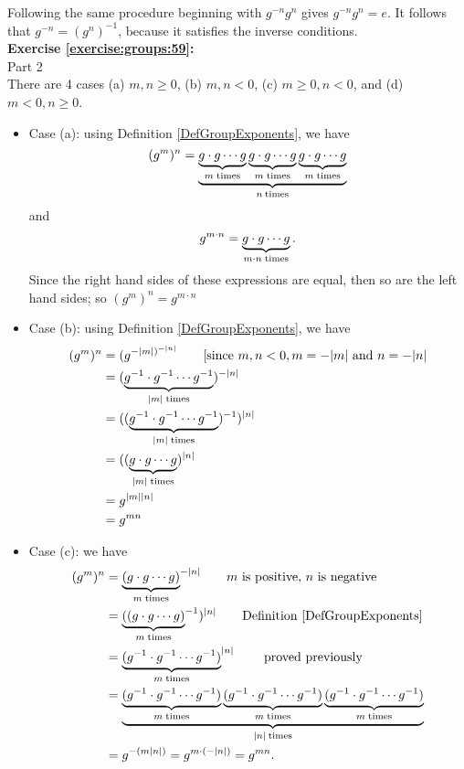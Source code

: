 \noindent Following the same procedure beginning with $g^{-n} g^n$ gives $g^{-n} g^n = e$.
It follows that $g^{-n} = (g^n)^{-1}$, because it satisfies the inverse conditions.
\\

\noindent\textbf{Exercise \ref{exercise:groups:59}:}
\\
Part 2\\
There are 4 cases (a) $m, n \geq 0$, (b) $m, n < 0$, (c) $m \geq 0, n < 0$, and (d) $m < 0, n \geq 0$.\\
\begin{itemize}
\item
Case (a): using Definition \ref{DefGroupExponents}, we have\\
\[
(g^m)^n = \underbrace{ \underbrace{g \cdot g \cdots g}_{m \; {\rm times}}\underbrace{g \cdot g \cdots g}_{m \; {\rm times}}\underbrace{g \cdot g \cdots g}_{m \; {\rm times}}}_{n \: {\rm times}}
\]
and
\[
g^{m \cdot n} = \underbrace{g \cdot g \cdots g}_{m \cdot n \; {\rm times}}.
\]
Since the right hand sides of these expressions are equal, then so are the left hand sides; so $(g^m)^n = g^{m \cdot n}$\\

\item
Case (b): using Definition  \ref{DefGroupExponents}, we have\\
\begin{align*}
(g^m)^n &= (g^{-{|m|})^{-|n|}}  \qquad \text{[since }m,n < 0, m=-|m| \text{ and } n=-|n|\\
&= ( \underbrace{g^{-1} \cdot g^{-1} \cdots g^{-1}}_{|m| \; {\rm times}})^{-|n|}\\
&= (( \underbrace{g^{-1} \cdot g^{-1} \cdots g^{-1}}_{|m| \; {\rm times}})^{-1})^{|n|}\\
&= (( \underbrace{g \cdot g \cdots g}_{|m| \; {\rm times}})^{|n|}\\
& = g^{|m||n|}\\
&=g^{mn}
\end{align*}

\item
Case (c): we have\\
\begin{align*}
(g^m)^n &= {\underbrace{(g \cdot g \cdots g)}_{m \; {\rm times}}}^{-|n|}  \quad \quad m \text{ is positive, } n \text{ is negative}\\
&= {\underbrace{((g \cdot g \cdots g)}_{m \; {\rm times}}}^{-1})^{|n|}  \quad \quad \text{Definition  \ref{DefGroupExponents}}\\
& = {\underbrace{(g^{-1} \cdot g^{-1}  \cdots g^{-1})}_{m \; {\rm times}}}^{|n|}  \quad \quad \text{ proved previously}\\
&= \underbrace{ \underbrace{(g^{-1} \cdot g^{-1} \cdots g^{-1})}_{m \; {\rm times}}\underbrace{(g^{-1} \cdot g^{-1} \cdots g^{-1})}_{m \; {\rm times}}\underbrace{(g^{-1} \cdot g^{-1} \cdots g^{-1})}_{m \; {\rm times}}}_{|n| \: {\rm times}}\\
 &= g^{-(m  |n|)} = g^{m \cdot (-|n|)} = g^{mn}.
\end{align*}


\end{itemize}
